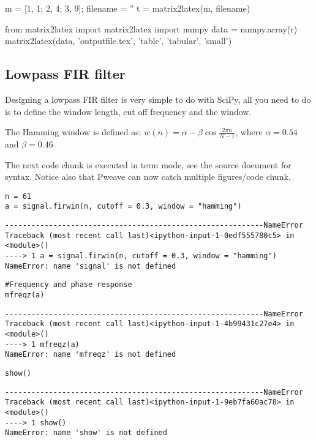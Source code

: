 \documentclass[a4paper,11pt,final]{article}
\begin{document}
m = [1, 1; 2, 4; 3, 9]; 
filename = '' %
t = matrix2latex(m, filename)

from matrix2latex import matrix2latex
import numpy
data = numpy.array(r)
matrix2latex(data, 'outputfile.tex', 'table', 'tabular', 'small')


\subsection{Lowpass FIR filter}

Designing a lowpass FIR filter is very simple to do with SciPy, all you
need to do is to define the window length, cut off frequency and the
window.

The Hamming window is defined as:
$w(n) = \alpha - \beta\cos\frac{2\pi n}{N-1}$, where $\alpha=0.54$ and
$\beta=0.46$

The next code chunk is executed in term mode, see the source document
for syntax. Notice also that Pweave can now catch multiple
figures/code chunk.


\begin{verbatim}
n = 61
a = signal.firwin(n, cutoff = 0.3, window = "hamming")
\end{verbatim}
\begin{verbatim}
-----------------------------------------------------------NameError
Traceback (most recent call last)<ipython-input-1-0edf555780c5> in
<module>()
----> 1 a = signal.firwin(n, cutoff = 0.3, window = "hamming")
NameError: name 'signal' is not defined
\end{verbatim}

\begin{verbatim}
#Frequency and phase response
mfreqz(a)
\end{verbatim}
\begin{verbatim}
-----------------------------------------------------------NameError
Traceback (most recent call last)<ipython-input-1-4b99431c27e4> in
<module>()
----> 1 mfreqz(a)
NameError: name 'mfreqz' is not defined
\end{verbatim}

\begin{verbatim}
show()
\end{verbatim}
\begin{verbatim}
-----------------------------------------------------------NameError
Traceback (most recent call last)<ipython-input-1-9eb7fa60ac78> in
<module>()
----> 1 show()
NameError: name 'show' is not defined
\end{verbatim}
\end{document}
